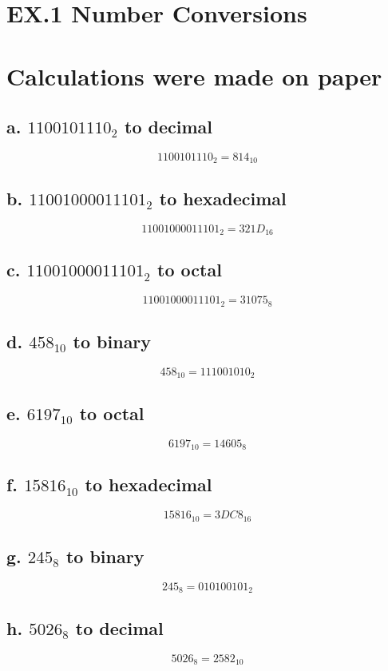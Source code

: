 \documentclass{article}
\begin{document}
\section*{EX.1 Number Conversions}
\section*{ Calculations were made on paper }
\subsection*{a. \( 1100101110_2 \) to decimal}
\[
1100101110_2 = 814_{10}
\]

\subsection*{b. \( 11001000011101_2 \) to hexadecimal}
\[
11001000011101_2 = 321D_{16}
\]

\subsection*{c. \( 11001000011101_2 \) to octal}
\[
11001000011101_2 = 31075_8
\]

\subsection*{d. \( 458_{10} \) to binary}
\[
458_{10} = 111001010_2
\]

\subsection*{e. \( 6197_{10} \) to octal}
\[
6197_{10} = 14605_8
\]

\subsection*{f. \( 15816_{10} \) to hexadecimal}
\[
15816_{10} = 3DC8_{16}
\]

\subsection*{g. \( 245_8 \) to binary}
\[
245_8 = 010100101_2
\]

\subsection*{h. \( 5026_8 \) to decimal}
\[
5026_8 = 2582_{10}
\]
\end{document}
